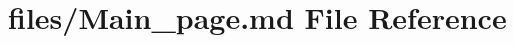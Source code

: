 \hypertarget{Main__page_8md}{}\section{files/\+Main\+\_\+page.md File Reference}
\label{Main__page_8md}
